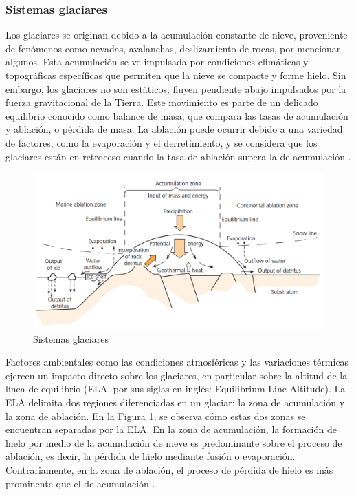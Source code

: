 \subsubsection{Sistemas glaciares}

Los glaciares se originan debido a la acumulación constante de nieve, proveniente de fenómenos como nevadas, avalanchas, deslizamiento de rocas, por mencionar algunos. Esta acumulación se ve impulsada por condiciones climáticas y topográficas específicas que permiten que la nieve se compacte y forme hielo. Sin embargo, los glaciares no son estáticos; fluyen pendiente abajo impulsados por la fuerza gravitacional de la Tierra. Este movimiento es parte de un delicado equilibrio conocido como balance de masa, que compara las tasas de acumulación y ablación, o pérdida de masa. La ablación puede ocurrir debido a una variedad de factores, como la evaporación y el derretimiento, y se considera que los glaciares están en retroceso cuando la tasa de ablación supera la de acumulación \cite{benn2010glaciers}.

\begin{figure}[H]
    \begin{center}
        \includegraphics[width=1\textwidth]{Images/Glaciares.png}
    \end{center}
    \caption{Sistemas glaciares}
    \label{fig:SistemasGlaciares}
\end{figure}

Factores ambientales como las condiciones atmosféricas y las variaciones térmicas ejercen un impacto directo sobre los glaciares, en particular sobre la altitud de la línea de equilibrio (ELA, por sus siglas en inglés: Equilibrium Line Altitude). La ELA delimita dos regiones diferenciadas en un glaciar: la zona de acumulación y la zona de ablación. En la Figura \ref{fig:SistemasGlaciares}, se observa cómo estas dos zonas se encuentran separadas por la ELA. En la zona de acumulación, la formación de hielo por medio de la acumulación de nieve es predominante sobre el proceso de ablación, es decir, la pérdida de hielo mediante fusión o evaporación. Contrariamente, en la zona de ablación, el proceso de pérdida de hielo es más prominente que el de acumulación  \cite{benn2010glaciers}.

